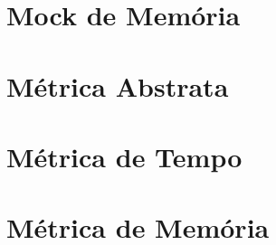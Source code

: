 \documentclass[12pt]{tcc}
\begin{document}
\section{Mock de Memória}


\section{Métrica Abstrata}


\section{Métrica de Tempo}


\section{Métrica de Memória}

\end{document}
